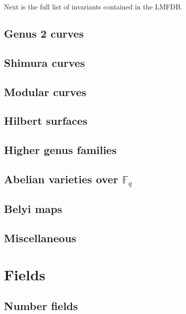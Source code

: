 Next is the full list of invariants contained in the LMFDB.



\section{Genus 2 curves}


\section{Shimura curves}


\section{Modular curves}


\section{Hilbert surfaces}


\section{Higher genus families}


\section{Abelian varieties over $\mathbb{F}_q$}


\section{Belyi maps}


\section{Miscellaneous}


\chapter{Fields}

\section{Number fields}

